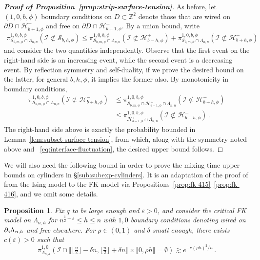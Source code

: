 \documentclass[reqno,11pt]{amsart}
\numberwithin{equation}{section}
\renewcommand{\epsilon}{\varepsilon}
\newtheorem{proposition}[theorem]{Proposition}
\theoremstyle{definition}{
\newtheorem{example}[theorem]{Example}
\newtheorem{definition}[theorem]{Definition}
\newtheorem*{definition*}{Definition}
\newtheorem{problem}[theorem]{Problem}
\newtheorem{question}[theorem]{Question}
\newtheorem{remark}[theorem]{Remark}
}
\newcommand{\cS}{\ensuremath{\mathcal S}}
\newcommand{\llb }{\llbracket}
\newcommand{\rrb }{\rrbracket}
\renewcommand{\epsilon}{\varepsilon}
\newcommand{\south}{{\textsc{s}}}
\begin{document}
\begin{proof}[\emph{\textbf{Proof of Proposition~\ref{prop:strip-surface-tension}}}]
As before, let $(1,0,b,\phi)$ boundary conditions on $D\subset \mathbb Z^2$ denote those that are wired on $\partial D\cap \mathcal H_{b+1,\phi}^+$ and free on $\partial D\cap \mathcal H_{b+1,\phi}^-$.
By a union bound, write
\begin{align}\label{eq:interface-fluctuation}
\pi_{\cS_{b,m,\phi}\cap \Lambda_{n,n}}^{1,0,b,\phi}(\mathcal I \not \subset \mathcal S_{b,h,\phi} )\leq \pi_{\cS_{b,m,\phi}\cap \Lambda_{n,n}}^{1,0,b,\phi}(\mathcal I \not \subset \mathcal H^+_{b-h,\phi} )+ \pi_{\cS_{b,m,\phi}\cap \Lambda_{n,n}}^{1,0,b,\phi}(\mathcal I \not \subset \mathcal H^-_{b+h,\phi} )
\end{align}
and consider the two quantities independently. Observe that the first event on the right-hand side is an increasing event, while the second event is a decreasing event. By reflection symmetry and self-duality, if we prove the desired bound on the latter, for general $b,h,\phi$, it implies the former also.
By monotonicity in boundary conditions,
\begin{align*}
\pi_{\cS_{b,m,\phi}\cap \Lambda_{n,n}}^{1,0,b,\phi} (\mathcal I \not \subset \mathcal H^-_{b+h,\phi}) & \leq \pi _{\cS_{b,m,\phi}\cap \mathcal H^+_{b-1,\phi}\cap \Lambda_{n,n}}^{1,0,b,\phi} (\mathcal I\not \subset \mathcal H^-_{b+h,\phi}) \\
& \leq \pi_{\mathcal H^+_{b-1,\phi}\cap \Lambda_{n,n}} ^{1,0,b,\phi} (\mathcal I\not \subset \mathcal H^-_{b+h,\phi})\,.
\end{align*}
The right-hand side above is exactly the probability bounded in Lemma~\ref{lem:subset-surface-tension}, from which, along with the symmetry noted above and ~\eqref{eq:interface-fluctuation}, the desired upper bound follows.
\end{proof}  

We will also need the following bound in order to prove the mixing time upper bounds on cylinders in \S\ref{sub:subexp-cylinders}. It is an adaptation of the proof of \cite[Lemma A.6]{MaTo10} from the Ising model to the FK model via Propositions~\ref{prop:fk-415}--\ref{prop:fk-416}, and we omit some details.


\begin{proposition}\label{prop:cylinder-midpoint-estimate}
Fix $q$ to be large enough and $\epsilon>0$, and  consider the critical FK model on $\Lambda_{n,h}$ for $n^{\frac 12+\epsilon} \leq h\leq n$ with $1,0$ boundary conditions denoting wired on $\partial_\south \Lambda_{n,h}$ and free elsewhere. For $\rho\in(0,1)$ and $\delta$ small enough, there exists $c(\epsilon)>0$ such that
\[\pi_{\Lambda_{n,h}}^{1,0}(\mathcal I \cap  \llb\lfloor \tfrac n2\rfloor- {\delta n}, \lfloor \tfrac n2\rfloor +{\delta n} \rrb \times \llb 0,\rho h\rrb=\emptyset) \gtrsim e^{-c(\rho h)^2/n}\,.
\]
\end{proposition}
\end{document}
